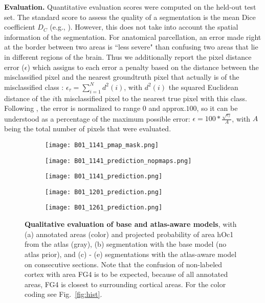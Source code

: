 \documentclass{article}
\begin{document}
\textbf{Evaluation.}
Quantitative evaluation scores were computed on the held-out test set.
The standard score to assess the quality of a segmentation is the mean Dice coefficient $D_C$ (e.g., \cite{lee2011, brebisson2015}).
However, this does not take into account the spatial information of the segmentation.
For anatomical parcellation, an error made right at the border between two areas is ``less severe" than confusing two areas that lie in different regions of the brain.
Thus we additionally report the pixel distance error ($\epsilon$) which assigns to each error a penalty based on the distance between the misclassified pixel and the nearest groundtruth pixel that actually is of the misclassified class \cite{yasnoff1977}:
$\epsilon_{\tau} = \sum_{i=1}^{N} d^2(i)$, with $d^2(i)$ the squared Euclidean distance of the $i$th misclassified pixel to the nearest true pixel with this class.
Following \cite{yasnoff1977}, the error is normalized to range $0$ and approx.\;$100$, so it can be understood as a percentage of the maximum possible error:
$\epsilon = 100*\frac{\sqrt{\epsilon_{\tau}}}{A}$, with $A$ being the total number of pixels that were evaluated.

\begin{figure*}[t!]
	\centering
	\begin{subfigure}[t]{.19\linewidth}
		\centering
		\texttt{[image: B01\_1141\_pmap\_mask.png]}
	\end{subfigure}%
	\begin{subfigure}[t]{.19\linewidth}
		\centering
		\texttt{[image: B01\_1141\_prediction\_nopmaps.png]}
	\end{subfigure}%
	\begin{subfigure}[t]{.19\linewidth}
		\centering
		\texttt{[image: B01\_1141\_prediction.png]}
	\end{subfigure}%
	\begin{subfigure}[t]{.19\linewidth}
		\centering
		\texttt{[image: B01\_1201\_prediction.png]}
	\end{subfigure}%
	\begin{subfigure}[t]{.19\linewidth}
		\centering
		\texttt{[image: B01\_1261\_prediction.png]}
	\end{subfigure}
	\caption{
		\textbf{Qualitative evaluation of base and atlas-aware models},
		with (a) annotated areas (color) and projected probability of area hOc1 from the atlas (gray),
		(b) segmentation with the base model (no atlas prior),
		and (c) - (e) segmentations with the atlas-aware model on consecutive sections.
		Note that the confusion of non-labeled cortex with area FG4 is to be expected, because of all annotated areas, FG4 is closest to surrounding cortical areas. %
		For the color coding see Fig.~\ref{fig:hist}.
	}
	\label{fig:res}
\end{figure*}
\end{document}
